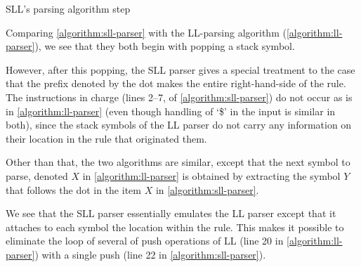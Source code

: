 \begin{algorithm}[h]
  \caption{\label{algorithm:sll-parser}
  SLL's parsing algorithm step}
  \begin{algorithmic}[1]
        \ELSE
        \FI %
      \FI %
      \CONTINUE{}
    \FI
        \CONTINUE{}
      \FI
        \CONTINUE{}
      \FI %
    \FI %
  \end{algorithmic}
\end{algorithm}

Comparing \cref{algorithm:sll-parser} with the LL-parsing algorithm
(\cref{algorithm:ll-parser}), we see that they both begin with popping a stack 
symbol. 

However, after this popping, the SLL parser gives a special treatment to the
case that the prefix denoted by the dot makes the entire right-hand-side of the
rule. The instructions in charge (lines 2--7, of \cref{algorithm:sll-parser})
do not occur as is in \cref{algorithm:ll-parser} (even though handling of `\$'
in the input is similar in both), since the stack symbols of the LL parser do
not carry any information on their location in the rule that originated them. 

Other than that, the two algorithms are similar, except that the next symbol to
parse, denoted $X$ in \cref{algorithm:ll-parser} is obtained by extracting the
symbol $Y$ that follows the dot in the item $X$ in \cref{algorithm:sll-parser}.

We see that the SLL parser essentially emulates the LL parser except that it
attaches to each symbol the location within the rule. This makes it possible to
eliminate the loop of several of push operations of LL (line 20 in
\cref{algorithm:ll-parser}) with a single push (line 22 in
\cref{algorithm:sll-parser}). 

